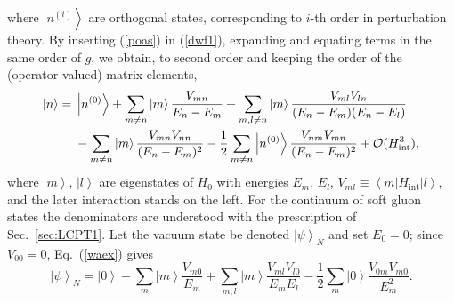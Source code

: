 \documentclass[a4paper,11pt]{article}
\begin{document}
 where $\left|n^{(i)}\right\rangle $ are orthogonal states, corresponding to $i$-th order in perturbation theory. By inserting (\ref{poas}) in (\ref{dwf1}), expanding and equating terms in the same order of $g$, we obtain{\color{chg}, to second order and keeping the order of the (operator-valued) matrix elements,
\begin{align}\label{waex}
\left|n\right\rangle  = {} & \left|n^{(0)}\right\rangle +\sum_{m\neq n}\left|m\right\rangle\frac{V_{mn}}{E_{n}-E_{m}}+\sum_{m,l\neq n}\left|m\right\rangle\frac{V_{ml}V_{ln}}{(E_{n}-E_{m})(E_{n}-E_{l})}\notag \\
& -\sum_{m\neq n}\left|m\right\rangle\frac{V_{mn}V_{nn}}{(E_{n}-E_{m})^{2}}-\frac{1}{2}\sum_{m\neq n}\left|n^{(0)}\right\rangle\frac{V_{nm}V_{mn}}{(E_{n}-E_{m})^{2}}+\mathcal{O}(H_{\text{int}}^{3}),
\end{align}
where $\left|m\right\rangle$, $\left|l\right\rangle$ are eigenstates of $H_{0}$ with energies $E_{m}$, $E_{l}$, $V_{ml}\equiv\left\langle m\right|H_{\text{int}}\left|l\right\rangle$, and the later interaction stands on the left. For the continuum of soft gluon states the denominators are understood with the prescription of Sec.~\ref{sec:LCPT1}. Let the vacuum state be denoted $\left|\psi\right\rangle _{N}$ and set $E_{0}=0$; since $V_{00}=0$, Eq.~(\ref{waex}) gives
\begin{equation}
\left|\psi\right\rangle _{N}=\left|0\right\rangle -\sum_{m}\left|m\right\rangle \frac{V_{m0}}{E_{m}}+\sum_{m,l}\left|m\right\rangle \frac{V_{ml}V_{l0}}{E_{m}E_{l}}-\frac{1}{2}\sum_{m}\left|0\right\rangle\frac{V_{0m}V_{m0}}{E_{m}^{2}}.
\end{equation}}



\end{document}

